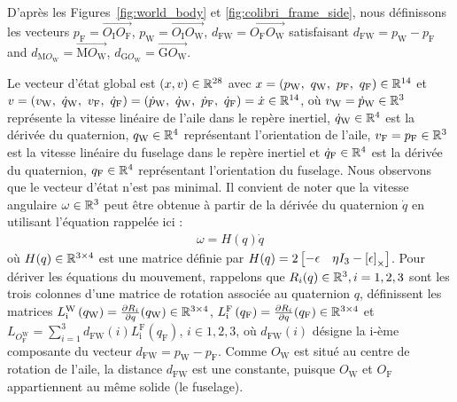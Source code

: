 D'après les Figures~\ref{fig:world_body} et \ref{fig:colibri_frame_side}, nous définissons les vecteurs $p_{\text{F}} = \overrightarrow{O_{\text{I}} O_{\text{F}}} $, $p_{\text{W}} = \overrightarrow{O_{\text{I}} O_{\text{W}}} $, $d_{\text{FW}} = \overrightarrow{O_{\text{F}} O_{\text{W}}} $ satisfaisant $d_{\text{FW}} = p_{\text{W}} - p_{\text{F}}$ and $d_{\text{M}O_{\text{W}}} = \overrightarrow{\text{M} O_{\text{W}} }$, $d_{\text{G}O_{\text{W}}} = \overrightarrow{\text{G} O_{\text{W}} }$.

Le vecteur d'état global est $(x,v) \in {\mathbb R}^{28}$ avec $x=(p_{\text{W}},~q_{\text{W}},~p_{\text{F}},~q_{\text{F}}) \in {\mathbb R}^{14}$ et $v=(v_{\text{W}},~\dot{q}_{\text{W}},~v_{\text{F}},~\dot{q}_{\text{F}}) = (\dot{p}_{\text{W}},~\dot{q}_{\text{W}},~\dot{p}_{\text{F}},~\dot{q}_{\text{F}})=\dot{x} \in {\mathbb R}^{14}$, où $v_{\text{W}} = \dot{p}_{\text{W}} \in {\mathbb R}^{3}$ représente la vitesse linéaire de l'aile dans le repère inertiel, $\dot{q}_{\text{W}} \in {\mathbb R}^{4}$  est la dérivée du quaternion, $q_{\text{W}} \in {\mathbb R}^{4}$ représentant l'orientation de l'aile, $v_{\text{F}} =p_{\text{F}} \in {\mathbb R}^{3}$  est la vitesse linéaire du fuselage dans le repère inertiel et $\dot{q}_{\text{F}} \in {\mathbb R}^{4}$  est la dérivée du quaternion, $q_{\text{F}} \in {\mathbb R}^{4}$ représentant l'orientation du fuselage. Nous observons que le vecteur d'état n'est pas minimal.
Il convient de noter que la vitesse angulaire $\omega \in {\mathbb R}^{3}$ peut être obtenue à partir de la dérivée du quaternion $\dot{q}$ en utilisant l'équation \cite[équation (2.7)]{udwadia-schutte} rappelée ici : 
\begin{align*}
    \omega = H(q) \dot{q} 
\end{align*}
où $H(q) \in {\mathbb R}^{3\times4}$ est une matrice définie par $H(q) = 2\begin{bmatrix}-\epsilon & \eta I_{3} - \left[\epsilon\right]_{\times}\end{bmatrix}$.
Pour dériver les équations du mouvement, rappelons que  $R_{i}(q) \in {\mathbb R}^{3}, i = 1,2,3$ sont les trois colonnes d'une matrice de rotation associée au quaternion $q$, définissent les matrices $L_{\text{i}}^{\text{W}} \left( q_{\text{W}} \right) = \frac{\partial R_{i}}{\partial q}(q_{\text{W}}) \in {\mathbb R}^{3\times4}$, 
$L_{\text{i}}^{\text{F}} \left( q_{\text{F}} \right) = \frac{\partial R_{i}}{\partial q}(q_{\text{F}}) \in {\mathbb R}^{3\times4}$ et
$L_{O_{\text{F}}^{\text{W}}} = \sum_{i=1}^{3} d_{\text{FW}}(i) L_{\text{i}}^{\text{F}} (q_{\text{F}})$, $i \in {1,2,3}$, où $d_{\text{FW}}(i)$ désigne la i-ème composante du vecteur $d_{\text{FW}} = p_{\text{W}} - p_{\text{F}}$. Comme $O_{\text{W}}$ est situé au centre de rotation de l'aile, la distance $d_{\text{FW}}$ est une constante, puisque $O_{\text{W}}$ et $O_{\text{F}}$ appartiennent au même solide (le fuselage).

